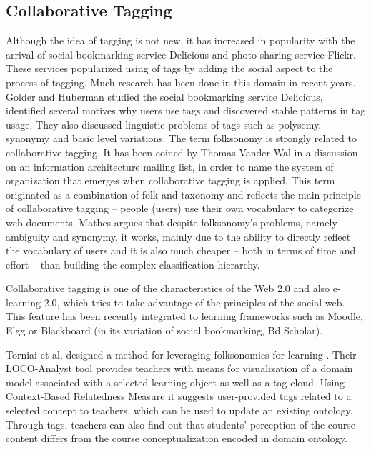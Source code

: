 \documentclass{IEEEtran}     %
\begin{document}
\subsection{Collaborative Tagging}   %
Although the idea of tagging is not new, it has increased
in popularity with the arrival of social bookmarking service
Delicious and photo sharing service Flickr. These services
popularized using of tags by adding the social aspect to the
process of tagging. Much research has been done in this
domain in recent years. Golder and Huberman \cite{golder2006usage} studied the
social bookmarking service Delicious, identified several
motives why users use tags and discovered stable patterns in
tag usage. They also discussed linguistic problems of tags
such as polysemy, synonymy and basic level variations.
The term folksonomy is strongly related to collaborative
tagging. It has been coined by Thomas Vander Wal in a
discussion on an information architecture mailing list, in
order to name the system of organization that emerges when
collaborative tagging is applied. This term originated as a
combination of folk and taxonomy and reflects the main
principle of collaborative tagging – people (users) use their
own vocabulary to categorize web documents. Mathes \cite{mathes2004folksonomies}
argues that despite folksonomy's problems, namely
ambiguity and synonymy, it works, mainly due to the ability
to directly reflect the vocabulary of users and it is also much
cheaper – both in terms of time and effort – than building the
complex classification hierarchy.

Collaborative tagging is one of the characteristics of the
Web 2.0 and also e-learning 2.0, which tries to take
advantage of the principles of the social web. This feature
has been recently integrated to learning frameworks such as
Moodle, Elgg or Blackboard (in its variation of social
bookmarking, Bd Scholar).

Torniai et al. designed a method for leveraging
folksonomies for learning \cite{torniai2008leveraging}. Their LOCO-Analyst tool
provides teachers with means for visualization of a domain
model associated with a selected learning object as well as a
tag cloud. Using Context-Based Relatedness Measure it
suggests user-provided tags related to a selected concept to
teachers, which can be used to update an existing ontology.
Through tags, teachers can also find out that students'
perception of the course content differs from the course
conceptualization encoded in domain ontology.
\end{document}

